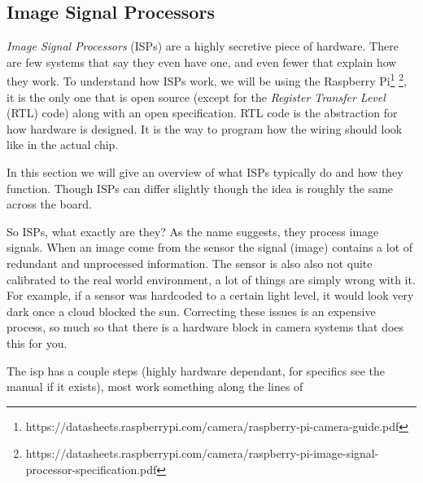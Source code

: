 \subsection{Image Signal Processors} \label{section:isp}
\textit{Image Signal Processors} (ISPs) are a highly secretive piece of
hardware\cite{adams2010frankencamera}. There are few systems that say they even
have one, and even fewer that explain how they work. To understand how ISPs
work, we will be using the Raspberry
Pi\footnote{https://datasheets.raspberrypi.com/camera/raspberry-pi-camera-guide.pdf}
\footnote{https://datasheets.raspberrypi.com/camera/raspberry-pi-image-signal-processor-specification.pdf},
it is the only one that is open source (except for the \textit{Register
Transfer Level} (RTL) code) along with an open specification. RTL code is the
abstraction for how hardware is designed. It is the way to program how the
wiring should look like in the actual chip.

In this section we will give an overview of what ISPs typically do and how they
function. Though ISPs can differ slightly though the idea is roughly the same
across the board.

So ISPs, what exactly are they? As the name suggests, they process image
signals. When an image come from the sensor the signal (image) contains a lot
of redundant and unprocessed information. The sensor is also also not quite
calibrated to the real world environment, a lot of things are simply wrong with
it. For example, if a sensor was hardcoded to a certain light level, it would
look very dark once a cloud blocked the sun. Correcting these issues is an
expensive process, so much so that there is a hardware block in camera systems
that does this for you.

The isp has a couple steps (highly hardware dependant, for specifics see the
manual if it exists), most work something along the lines of

